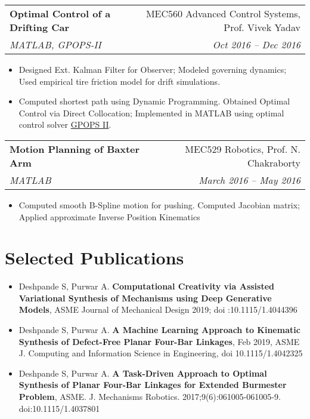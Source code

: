 \documentclass[letterpaper,10pt]{article}
\makeatletter
\newcommand{\resumeHeading}[4]{
  \vspace{-1pt}
    \begin{tabular*}{0.97\textwidth}{l@{\extracolsep{\fill}}r}
      \textbf{#1} & #2 \vspace{-2pt}\\ \vspace{1pt}
      \textit{\small#3} & \textit{\small #4} \\
    \end{tabular*}
}
\newcommand{\resumeSection}[1]{
\vspace{-12pt}
\section{\textbf{#1}}
}
\newcommand{\resumeItemListStart}{
\vspace{-7pt}
\begin{itemize}[leftmargin=14pt]
}
\newcommand{\resumeItemListEnd}{
\vspace{+7pt}
\end{itemize}
}
\newcommand{\resumeItem}[1]{
  \item\small{
      {#1 \vspace{-7pt}
      }
  }
}
\makeatother
\begin{document}
    \resumeHeading{Optimal Control of a Drifting Car}{MEC560 Advanced Control Systems, Prof. Vivek Yadav}{MATLAB, GPOPS-II}{Oct 2016 -- Dec 2016}
    \resumeItemListStart
      \resumeItem{Designed Ext. Kalman Filter for Observer; Modeled governing dynamics; Used empirical tire friction model for drift simulations.}
      \resumeItem{Computed shortest path using Dynamic Programming. Obtained Optimal Control via Direct Collocation; Implemented in MATLAB using optimal control solver \href{http://www.gpops2.com/}{GPOPS II}.}
    \resumeItemListEnd
    \resumeHeading{Motion Planning of Baxter Arm}{MEC529 Robotics, Prof. N. Chakraborty}{MATLAB}{March 2016 -- May 2016}
    \resumeItemListStart
      \resumeItem{Computed smooth B-Spline motion for pushing. Computed Jacobian matrix; Applied approximate Inverse Position Kinematics}
    \resumeItemListEnd



\resumeSection{Selected Publications}
\vspace{+7pt}
    \resumeItemListStart
      \resumeItem{Deshpande S, Purwar A. \textbf{Computational Creativity via Assisted Variational Synthesis of Mechanisms using Deep Generative Models}, ASME Journal of Mechanical Design 2019; doi :10.1115/1.4044396}
      \resumeItem{Deshpande S, Purwar A. \textbf{A Machine Learning Approach to Kinematic Synthesis of Defect-Free Planar Four-Bar Linkages}, Feb 2019, ASME J. Computing and Information Science in Engineering, doi 10.1115/1.4042325}
      \resumeItem{Deshpande S, Purwar A. \textbf{A Task-Driven Approach to Optimal Synthesis of Planar Four-Bar Linkages for Extended Burmester Problem}, ASME. J. Mechanisms Robotics. 2017;9(6):061005-061005-9. doi:10.1115/1.4037801}
    \resumeItemListEnd
\end{document}
